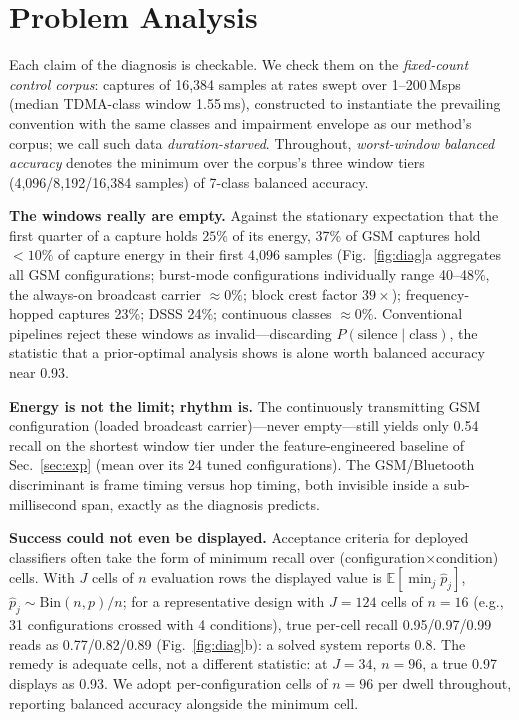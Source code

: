 \documentclass[10pt,twocolumn]{article}
\begin{document}
\section{Problem Analysis}
\label{sec:motiv}
Each claim of the diagnosis is checkable. We check them on the
\emph{fixed-count control corpus}: captures of 16{,}384 samples at rates
swept over 1--200\,Msps (median TDMA-class window 1.55\,ms), constructed to
instantiate the prevailing convention with the same classes and impairment
envelope as our method's corpus; we call such data \emph{duration-starved}.
Throughout, \emph{worst-window balanced accuracy} denotes the minimum over
the corpus's three window tiers (4{,}096/8{,}192/16{,}384 samples) of
7-class balanced accuracy.

\textbf{The windows really are empty.} Against the stationary expectation
that the first quarter of a capture holds $25\%$ of its energy, 37\% of GSM
captures hold ${<}10\%$ of capture energy in their first 4{,}096 samples
(Fig.~\ref{fig:diag}a aggregates all GSM configurations; burst-mode
configurations individually range 40--48\%, the always-on broadcast
carrier ${\approx}0\%$; block crest factor $39\times$); frequency-hopped
captures 23\%; DSSS 24\%; continuous classes ${\approx}0\%$. Conventional
pipelines reject these windows as invalid---discarding
$P(\text{silence}\mid\text{class})$, the statistic that a prior-optimal
analysis shows is alone worth balanced accuracy near 0.93.

\textbf{Energy is not the limit; rhythm is.} The continuously transmitting
GSM configuration (loaded broadcast carrier)---never empty---still yields
only 0.54 recall on the shortest window tier under the feature-engineered
baseline of Sec.~\ref{sec:exp} (mean over its 24 tuned configurations).
The GSM/Bluetooth discriminant is frame timing versus hop timing, both
invisible inside a sub-millisecond span, exactly as the diagnosis
predicts.

\textbf{Success could not even be displayed.} Acceptance criteria for
deployed classifiers often take the form of minimum recall over
(configuration$\times$condition) cells. With $J$ cells of $n$ evaluation
rows the displayed value is $\mathbb{E}[\min_j \hat p_j]$,
$\hat p_j \sim \mathrm{Bin}(n,p)/n$; for a representative design with
$J{=}124$ cells of $n{=}16$ (e.g., 31 configurations crossed with 4
conditions), true per-cell recall 0.95/0.97/0.99 reads as 0.77/0.82/0.89
(Fig.~\ref{fig:diag}b): a solved system reports 0.8. The remedy is
adequate cells, not a different statistic: at $J{=}34$, $n{=}96$, a true
0.97 displays as 0.93. We adopt per-configuration cells of $n{=}96$ per
dwell throughout, reporting balanced accuracy alongside the minimum
cell.
\end{document}
